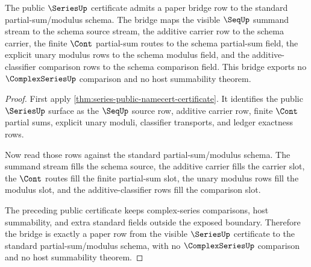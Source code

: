 \begin{theorem}
\label{thm:series-standard-bridge-schema-row}
The public $\SeriesUp$ certificate admits a paper bridge row to the standard
partial-sum/modulus schema. The bridge maps the visible $\SeqUp$ summand stream
to the schema source stream, the additive carrier row to the schema carrier,
the finite $\Cont$ partial-sum routes to the schema partial-sum field, the
explicit unary modulus rows to the schema modulus field, and the
additive-classifier comparison rows to the schema comparison field. This bridge
exports no $\ComplexSeriesUp$ comparison and no host summability theorem.
\end{theorem}
\begin{proof}
First apply \autoref{thm:series-public-namecert-certificate}. It identifies the
public $\SeriesUp$ surface as the $\SeqUp$ source row, additive carrier row,
finite $\Cont$ partial sums, explicit unary moduli, classifier transports, and
ledger exactness rows.

Now read those rows against the standard partial-sum/modulus schema. The
summand stream fills the schema source, the additive carrier fills the carrier
slot, the $\Cont$ routes fill the finite partial-sum slot, the unary modulus
rows fill the modulus slot, and the additive-classifier rows fill the comparison
slot.

The preceding public certificate keeps complex-series comparisons, host
summability, and extra standard fields outside the exposed boundary. Therefore
the bridge is exactly a paper row from the visible $\SeriesUp$ certificate to
the standard partial-sum/modulus schema, with no $\ComplexSeriesUp$ comparison
and no host summability theorem.
\end{proof}


